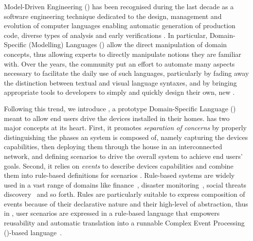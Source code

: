 Model-Driven Engineering (\MDE) has been recognised during the last decade as a software engineering technique dedicated to the design, management and evolution of computer languages enabling automatic generation of production code, diverse types of analysis and early verifications \cite{J:Lucio-Amrani-etAl:2014}. In particular, Domain-Specific (Modelling) Languages (\DSLS) allow the direct manipulation of domain concepts, thus allowing experts to directly manipulate notions they are familiar with. Over the years, the \MDE community put an effort to automate many aspects necessary to facilitate the daily use of such languages, particularly by fading away the distinction between textual and visual language syntaxes, and by bringing appropriate tools to developers to simply and quickly design their own, new \DSLS.

Following this trend, we introduce \IOTDSL, a prototype Domain-Specific Language (\DSL) meant to allow end users drive the \IOT devices installed in their homes. \IOTDSL has two major concepts at its heart. First, it promotes \emph{separation of concerns} by properly distinguishing the phases an \IOT system is composed of, namely capturing the devices capabilities, then deploying them through the house in an interconnected network, and defining scenarios to drive the overall system to achieve end users' goals. Second, it relies on \emph{events} to describe devices capabilities and combine them into rule-based definitions for scenarios \cite{muhl-06,cristea-11}.  Rule-based systems are widely used in a vast range of domains like finance~\cite{schultz-09}, disaster monitoring~\cite{broda-09}, social threats discovery~\cite{baran-13} and so forth. Rules are particularly suitable to express composition of events because of their declarative nature and their high-level of abstraction, thus in \IOTDSL, user scenarios are expressed in a rule-based language that empowers reusability and automatic translation into a runnable Complex Event Processing (\CEP)-based language~\cite{Cugola-Margara:2010}.


